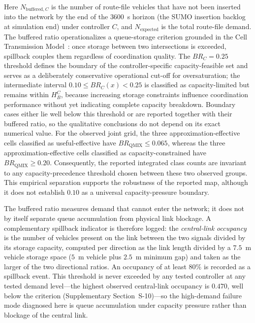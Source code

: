 \documentclass[review,12pt]{elsarticle}
\begin{document}
Here $N_{\mathrm{buffered},C}$ is the number of route-file vehicles that have not been inserted into the network by the end of the $3600$~s horizon (the SUMO insertion backlog at simulation end) under controller $C$, and $N_{\mathrm{expected}}$ is the total route-file demand. The buffered ratio operationalizes a queue-storage criterion grounded in the Cell Transmission Model~\cite{daganzo1994cell}: once storage between two intersections is exceeded, spillback couples them regardless of coordination quality. The $BR_C=0.25$ threshold defines the boundary of the controller-specific capacity-feasible set and serves as a deliberately conservative operational cut-off for oversaturation; the intermediate interval $0.10 \le BR_C(x) < 0.25$ is classified as capacity-limited but remains within $H_B^C$, because increasing storage constraints influence coordination performance without yet indicating complete capacity breakdown. Boundary cases either lie well below this threshold or are reported together with their buffered ratio, so the qualitative conclusions do not depend on its exact numerical value. For the observed joint grid, the three approximation-effective cells classified as useful-effective have $BR_{\mathrm{QMIX}}\leq0.065$, whereas the three approximation-effective cells classified as capacity-constrained have $BR_{\mathrm{QMIX}}\geq0.20$. Consequently, the reported integrated class counts are invariant to any capacity-precedence threshold chosen between these two observed groups. This empirical separation supports the robustness of the reported map, although it does not establish $0.10$ as a universal capacity-pressure boundary.

The buffered ratio measures demand that cannot enter the network; it does not by
itself separate queue accumulation from physical link blockage. A complementary
spillback indicator is therefore logged: the \emph{central-link occupancy} is the
number of vehicles present on the link between the two signals divided by its
storage capacity, computed per direction as the link length divided by a
$7.5$~m vehicle storage space ($5$~m vehicle plus $2.5$~m minimum gap) and taken
as the larger of the two directional ratios. An occupancy of at least $80\%$ is
recorded as a spillback event. This threshold is never exceeded by any tested controller at any tested demand level---the highest observed central-link occupancy is $0.470$, well below the criterion (Supplementary Section~S-10)---so the high-demand failure mode diagnosed here is queue accumulation under capacity pressure rather than blockage of the central link.
\end{document}
